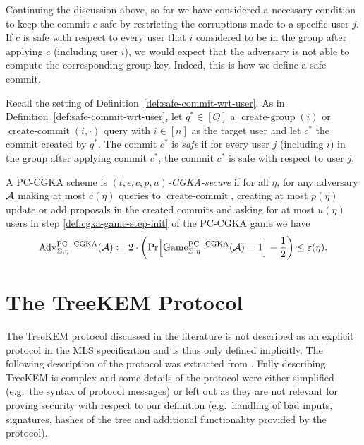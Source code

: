 
Continuing the discussion above, so far we have considered a necessary condition to keep the commit $c$ safe by restricting the corruptions made to a specific user $j$. If $c$ is safe with respect to every user that $i$ considered to be in the group after applying $c$ (including user $i$), we would expect that the adversary is not able to compute the corresponding group key. Indeed, this is how we define a safe commit.

\begin{definition} \label{def:safe-commit}
	Recall the setting of Definition~\ref{def:safe-commit-wrt-user}. As in Definition~\ref{def:safe-commit-wrt-user}, let $q^* \in [Q]$ a $\operatorname{create-group}(i)$ or $\operatorname{create-commit}(i, \cdot)$ query with $i \in [n]$ as the target user and let $c^*$ the commit created by $q^*$. The commit $c^*$ is \emph{safe} if for every user $j$ (including $i$) in the group after applying commit $c^*$, the commit $c^*$ is safe with respect to user $j$.
\end{definition}

\begin{definition}
	A PC-CGKA scheme is \emph{$(t, \epsilon, c, p, u)$-CGKA-secure} if for all $\eta$, for any adversary $\mathcal{A}$ making at most $c(\eta)$ queries to $\operatorname{create-commit}$, creating at most $p(\eta)$ update or add proposals in the created commits and asking for at most $u(\eta)$ users in step \ref{def:cgka-game-step-init} of the PC-CGKA game we have
	\begin{align*}
		\advantage{\Sigma}{\eta}{PC-CGKA}(\adv) \coloneqq 2 \cdot \left(\pr{\game{\Sigma}{\eta}{PC-CGKA}(\adv) = 1} - \frac{1}{2}\right) \le \epsilon(\eta).
	\end{align*}
\end{definition}

\section{The TreeKEM Protocol}

The TreeKEM protocol discussed in the literature is not described as an explicit protocol in the MLS specification \cite{rfc9420} and is thus only defined implicitly. The following description of the protocol was extracted from \cite{rfc9420}. Fully describing TreeKEM is complex and some details of the protocol were either simplified (e.g.\ the syntax of protocol messages) or left out as they are not relevant for proving security with respect to our definition (e.g.\ handling of bad inputs, signatures, hashes of the tree and additional functionality provided by the protocol).

